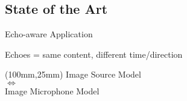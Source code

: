 \subsection{State of the Art}

\begin{frame}[t]{Echo-aware Application \hfill\faBook}

    \begin{block}{Echoes = same content, different time/direction}
        \centering
    \end{block}

    \begin{textblock*}{30mm}(100mm,25mm)
        \centering
        \small
        \textcolor{myred}{%
            Image Source Model
            \\$\Leftrightarrow$
            \\Image Microphone Model}
    \end{textblock*}


\end{frame}

